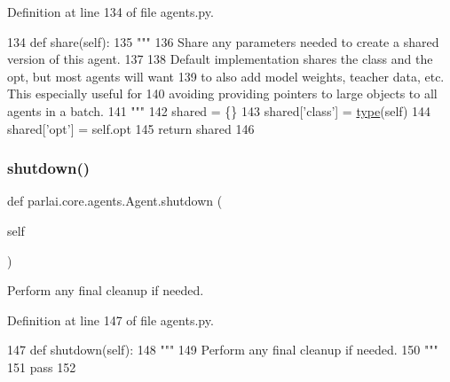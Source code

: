 Definition at line 134 of file agents.\+py.


\begin{DoxyCode}
134     \textcolor{keyword}{def }share(self):
135         \textcolor{stringliteral}{"""}
136 \textcolor{stringliteral}{        Share any parameters needed to create a shared version of this agent.}
137 \textcolor{stringliteral}{}
138 \textcolor{stringliteral}{        Default implementation shares the class and the opt, but most agents will want}
139 \textcolor{stringliteral}{        to also add model weights, teacher data, etc. This especially useful for}
140 \textcolor{stringliteral}{        avoiding providing pointers to large objects to all agents in a batch.}
141 \textcolor{stringliteral}{        """}
142         shared = \{\}
143         shared[\textcolor{stringliteral}{'class'}] = \hyperlink{namespaceparlai_1_1agents_1_1tfidf__retriever_1_1build__tfidf_ad5dfae268e23f506da084a9efb72f619}{type}(self)
144         shared[\textcolor{stringliteral}{'opt'}] = self.opt
145         \textcolor{keywordflow}{return} shared
146 
\end{DoxyCode}
\mbox{\label{classparlai_1_1core_1_1agents_1_1Agent_a801e5ca2a5e8e96a72f0c04549008e8f}} 
\subsubsection{\texorpdfstring{shutdown()}{shutdown()}}
{\footnotesize\ttfamily def parlai.\+core.\+agents.\+Agent.\+shutdown (\begin{DoxyParamCaption}\item[{}]{self }\end{DoxyParamCaption})}

\begin{DoxyVerb}Perform any final cleanup if needed.
\end{DoxyVerb}
 

Definition at line 147 of file agents.\+py.


\begin{DoxyCode}
147     \textcolor{keyword}{def }shutdown(self):
148         \textcolor{stringliteral}{"""}
149 \textcolor{stringliteral}{        Perform any final cleanup if needed.}
150 \textcolor{stringliteral}{        """}
151         \textcolor{keywordflow}{pass}
152 
\end{DoxyCode}
\mbox{\label{classparlai_1_1core_1_1agents_1_1Agent_ad6e5ea0357c43169d97b329566a33ee5}} 
